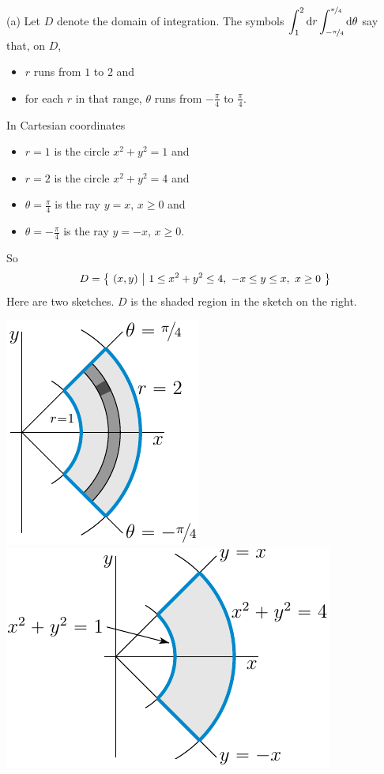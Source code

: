 \begin{solution}
(a)
Let $D$ denote the domain of integration. The symbols
$\displaystyle 
      \int_1^2\mathrm{d}r
     \int_{-\nicefrac{\pi}{4}}^{\nicefrac{\pi}{4}}\mathrm{d}\theta$ 
say that, on $D$,
\begin{itemize}
\item 
$r$ runs from $1$ to $2$ and
\item 
for each $r$ in that range,
$\theta$ runs from $-\frac{\pi}{4}$ to $\frac{\pi}{4}$.
\end{itemize}
In Cartesian coordinates
\begin{itemize}
\item 
$r=1$ is the circle $x^2+y^2=1$ and
\item 
$r=2$ is the circle $x^2+y^2=4$ and
\item
$\theta=\frac{\pi}{4}$ is the ray $y=x$, $x\ge 0$ and
\item 
$\theta=-\frac{\pi}{4}$ is the ray $y=-x$, $x\ge 0$.

\end{itemize}
So
\begin{align*}
D=\big\{ \ (x,y)\ \big|\ 1\le x^2+y^2\le 4,\ -x\le y\le x,\ x\ge 0\ \big\}
\end{align*}
Here are two sketches. $D$ is the shaded region in the sketch on the right.
\begin{center}
     \includegraphics{fig/polar6a1.pdf}\quad
     \includegraphics{fig/polar6a2.pdf}
\end{center}


\end{solution}

